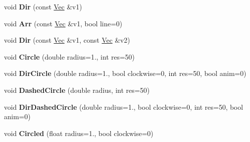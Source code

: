 \begin{DoxyCompactItemize}
\item 
\hypertarget{namespacevsr_1_1_g_l_1_1_glyph_a1607cf0faa8a3c620bfb47b6e7ea863b}{void {\bfseries Dir} (const \hyperlink{namespacevsr_a0d061c30ac198a710a1b92dd8b343273}{Vec} \&v1)}\label{namespacevsr_1_1_g_l_1_1_glyph_a1607cf0faa8a3c620bfb47b6e7ea863b}

\item 
\hypertarget{namespacevsr_1_1_g_l_1_1_glyph_aec266723c0d8c75a34204354ae83fa1e}{void {\bfseries Arr} (const \hyperlink{namespacevsr_a0d061c30ac198a710a1b92dd8b343273}{Vec} \&v1, bool line=0)}\label{namespacevsr_1_1_g_l_1_1_glyph_aec266723c0d8c75a34204354ae83fa1e}

\item 
\hypertarget{namespacevsr_1_1_g_l_1_1_glyph_ac385a21d12ff6b991cc232c038d3c029}{void {\bfseries Dir} (const \hyperlink{namespacevsr_a0d061c30ac198a710a1b92dd8b343273}{Vec} \&v1, const \hyperlink{namespacevsr_a0d061c30ac198a710a1b92dd8b343273}{Vec} \&v2)}\label{namespacevsr_1_1_g_l_1_1_glyph_ac385a21d12ff6b991cc232c038d3c029}

\item 
\hypertarget{namespacevsr_1_1_g_l_1_1_glyph_a2585685785dfb409f4ea874fe0bdd6e0}{void {\bfseries Circle} (double radius=1., int res=50)}\label{namespacevsr_1_1_g_l_1_1_glyph_a2585685785dfb409f4ea874fe0bdd6e0}

\item 
\hypertarget{namespacevsr_1_1_g_l_1_1_glyph_a835b5ea92ef20a55d7e9417ec5d1c55d}{void {\bfseries Dir\-Circle} (double radius=1., bool clockwise=0, int res=50, bool anim=0)}\label{namespacevsr_1_1_g_l_1_1_glyph_a835b5ea92ef20a55d7e9417ec5d1c55d}

\item 
\hypertarget{namespacevsr_1_1_g_l_1_1_glyph_a5d5bdb286223c11487f01953a0ddccdb}{void {\bfseries Dashed\-Circle} (double radius, int res=50)}\label{namespacevsr_1_1_g_l_1_1_glyph_a5d5bdb286223c11487f01953a0ddccdb}

\item 
\hypertarget{namespacevsr_1_1_g_l_1_1_glyph_accf2aa625f0c4b2feeabcf1185807cf5}{void {\bfseries Dir\-Dashed\-Circle} (double radius=1., bool clockwise=0, int res=50, bool anim=0)}\label{namespacevsr_1_1_g_l_1_1_glyph_accf2aa625f0c4b2feeabcf1185807cf5}

\item 
\hypertarget{namespacevsr_1_1_g_l_1_1_glyph_a3eb16a888db120681b497b5ed7dd88c0}{void {\bfseries Circled} (float radius=1., bool clockwise=0)}\label{namespacevsr_1_1_g_l_1_1_glyph_a3eb16a888db120681b497b5ed7dd88c0}


\end{DoxyCompactItemize}
